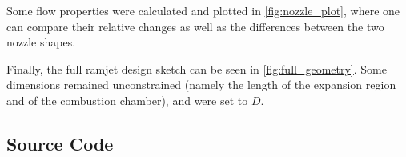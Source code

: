 \documentclass[12pt, openright, oneside, a4paper, english]{unbtex}
\begin{document}
Some flow properties were calculated and plotted in \cref{fig:nozzle_plot}, where one can compare their relative changes as well as the differences between the two nozzle shapes.



Finally, the full ramjet design sketch can be seen in \cref{fig:full_geometry}. Some dimensions remained unconstrained (namely the length of the expansion region and of the combustion chamber), and were set to \(D\).



\begin{apendicesenv}
    \chapter{Source Code}
    \label{sec:script}
    \inputminted[breaklines, linenos]{python}{listings/script.py}
\end{apendicesenv}
\end{document}
